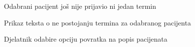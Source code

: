 \begin{packed_item}
\begin{packed_item}
						\item[3.a] Odabrani pacijent još nije prijavio ni jedan termin
						\item[] \begin{packed_enum}
							\item Prikaz teksta o ne postojanju termina za odabranog pacijenta
							\item Djelatnik odabire opciju povratka na popis pacijenata
											 							
						\end{packed_enum}
						
					\end{packed_item}
				\end{packed_item}
				
				\noindent {}
